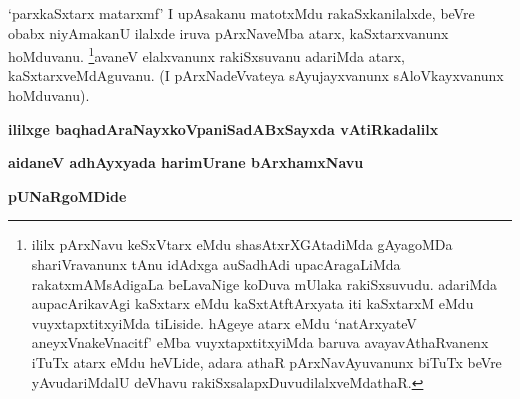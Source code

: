 \begin{artha}
`parxkaSxtarx matarxmf' I upAsakanu matotxMdu rakaSxkanilalxde, beVre obabx niyAmakanU ilalxde iruva pArxNaveMba atarx, kaSxtarxvanunx hoMduvanu. \footnote{ililx pArxNavu keSxVtarx eMdu shasAtxrXGAtadiMda gAyagoMDa shariVravanunx tAnu idAdxga auSadhAdi upacAragaLiMda rakatxmAMsAdigaLa beLavaNige koDuva mUlaka rakiSxsuvudu. adariMda aupacArikavAgi kaSxtarx eMdu kaSxtAtftArxyata iti kaSxtarxM eMdu vuyxtapxtitxyiMda tiLiside. hAgeye atarx eMdu `natArxyateV aneyxVnakeVnacitf' eMba vuyxtapxtitxyiMda baruva avayavAthaRvanenx iTuTx atarx eMdu heVLide, adara athaR pArxNavAyuvanunx biTuTx beVre yAvudariMdalU deVhavu rakiSxsalapxDuvudilalxveMdathaR.}avaneV elalxvanunx rakiSxsuvanu adariMda atarx, kaSxtarxveMdAguvanu. (I pArxNadeVvateya sAyujayxvanunx sAloVkayxvanunx hoMduvanu).
\end{artha}
\vskip 5pt
\begin{center}
{\bf ililxge baqhadAraNayxkoVpaniSadABxSayxda vAtiRkadalilx}

\smallskip
{\bf aidaneV adhAyxyada harimUrane bArxhamxNavu}

\smallskip
{\bf pUNaRgoMDide}
\end{center}
